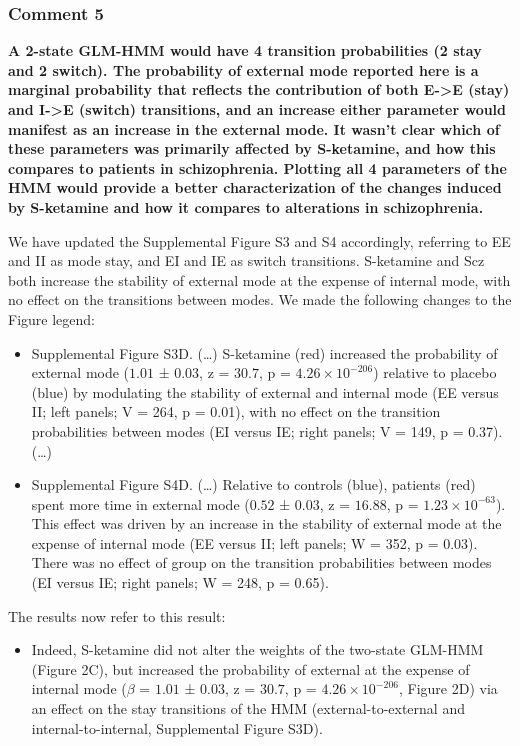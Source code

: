 \documentclass[
]{article}
\providecommand{\tightlist}{%
  \setlength{\itemsep}{0pt}\setlength{\parskip}{0pt}}
\begin{document}
\subsubsection{Comment 5}\label{comment-5-2}

\textbf{A 2-state GLM-HMM would have 4 transition probabilities (2 stay
and 2 switch). The probability of external mode reported here is a
marginal probability that reflects the contribution of both
E-\textgreater E (stay) and I-\textgreater E (switch) transitions, and
an increase either parameter would manifest as an increase in the
external mode. It wasn't clear which of these parameters was primarily
affected by S-ketamine, and how this compares to patients in
schizophrenia. Plotting all 4 parameters of the HMM would provide a
better characterization of the changes induced by S-ketamine and how it
compares to alterations in schizophrenia.}

We have updated the Supplemental Figure S3 and S4 accordingly, referring
to EE and II as mode stay, and EI and IE as switch transitions.
S-ketamine and Scz both increase the stability of external mode at the
expense of internal mode, with no effect on the transitions between
modes. We made the following changes to the Figure legend:

\begin{itemize}
\item
  Supplemental Figure S3D. (\ldots) S-ketamine (red) increased the
  probability of external mode (\(1.01\) ± \(0.03\), z = \(30.7\), p =
  \(\ensuremath{4.26\times 10^{-206}}\)) relative to placebo (blue) by
  modulating the stability of external and internal mode (EE versus II;
  left panels; V = 264, p = 0.01), with no effect on the transition
  probabilities between modes (EI versus IE; right panels; V = 149, p =
  0.37). (\ldots)
\item
  Supplemental Figure S4D. (\ldots) Relative to controls (blue),
  patients (red) spent more time in external mode (\(0.52\) ± \(0.03\),
  z = \(16.88\), p = \(\ensuremath{1.23\times 10^{-63}}\)). This effect
  was driven by an increase in the stability of external mode at the
  expense of internal mode (EE versus II; left panels; W = 352, p =
  0.03). There was no effect of group on the transition probabilities
  between modes (EI versus IE; right panels; W = 248, p = 0.65).
\end{itemize}

The results now refer to this result:

\begin{itemize}
\tightlist
\item
  Indeed, S-ketamine did not alter the weights of the two-state GLM-HMM
  (Figure 2C), but increased the probability of external at the expense
  of internal mode (\(\beta\) = \(1.01\) ± \(0.03\), z = \(30.7\), p =
  \(\ensuremath{4.26\times 10^{-206}}\), Figure 2D) via an effect on the
  stay transitions of the HMM (external-to-external and
  internal-to-internal, Supplemental Figure S3D).
\end{itemize}
\end{document}
